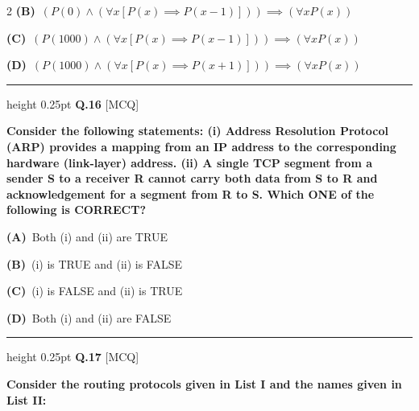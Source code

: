 \documentclass[a4paper,10pt,twoside]{article}
\begin{document}
\begin{multicols}{2}
\textbf{(B)}~$(P(0) \land (\forall x [P(x) \implies P(x-1)])) \implies (\forall x P(x))$\par\vspace{2pt}\noindent
\textbf{(C)}~$(P(1000) \land (\forall x [P(x) \implies P(x-1)])) \implies (\forall x P(x))$\par\vspace{2pt}\noindent
\textbf{(D)}~$(P(1000) \land (\forall x [P(x) \implies P(x+1)])) \implies (\forall x P(x))$
\par\vspace{6pt}\hrule height 0.25pt\vspace{6pt}
\noindent\textbf{Q.16} \hfill {\footnotesize\textsf{[MCQ]}}
\par\vspace{2pt}
{\bfseries Consider the following statements:
(i) Address Resolution Protocol (ARP) provides a mapping from an IP address to the corresponding hardware (link-layer) address.
(ii) A single TCP segment from a sender S to a receiver R cannot carry both data from S to R and acknowledgement for a segment from R to S.
Which ONE of the following is CORRECT? \par}
\par\vspace{2pt}\noindent
\textbf{(A)}~Both (i) and (ii) are TRUE\par\vspace{2pt}\noindent
\textbf{(B)}~(i) is TRUE and (ii) is FALSE\par\vspace{2pt}\noindent
\textbf{(C)}~(i) is FALSE and (ii) is TRUE\par\vspace{2pt}\noindent
\textbf{(D)}~Both (i) and (ii) are FALSE
\par\vspace{6pt}\hrule height 0.25pt\vspace{6pt}
\noindent\textbf{Q.17} \hfill {\footnotesize\textsf{[MCQ]}}
\par\vspace{2pt}
{\bfseries Consider the routing protocols given in List I and the names given in List II:
\par\smallskip
\begin{center}\footnotesize
{}
\end{center}}
\end{multicols}
\end{document}
